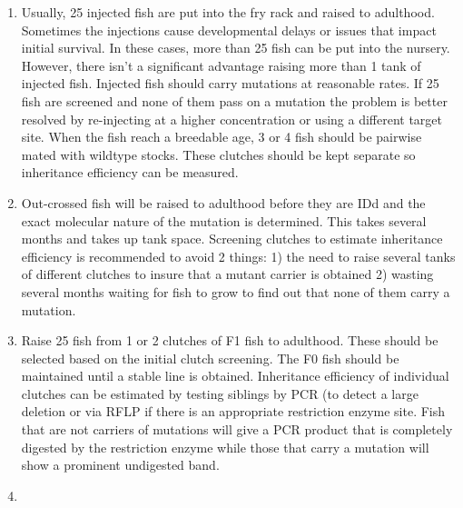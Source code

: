 \documentclass[
  letterpaper,
  DIV=11,
  numbers=noendperiod]{scrreprt}
\begin{document}
\begin{tcolorbox}[enhanced jigsaw, toprule=.15mm, breakable, coltitle=black, leftrule=.75mm, title=\textcolor{quarto-callout-note-color}{\faInfo}\hspace{0.5em}{Notes}, bottomrule=.15mm, toptitle=1mm, bottomtitle=1mm, colframe=quarto-callout-note-color-frame, opacityback=0, colback=white, opacitybacktitle=0.6, colbacktitle=quarto-callout-note-color!10!white, rightrule=.15mm, titlerule=0mm, arc=.35mm, left=2mm]

\begin{enumerate}
\def\labelenumi{\arabic{enumi}.}
\item
  Usually, 25 injected fish are put into the fry rack and raised to
  adulthood. Sometimes the injections cause developmental delays or
  issues that impact initial survival. In these cases, more than 25 fish
  can be put into the nursery. However, there isn't a significant
  advantage raising more than 1 tank of injected fish. Injected fish
  should carry mutations at reasonable rates. If 25 fish are screened
  and none of them pass on a mutation the problem is better resolved by
  re-injecting at a higher concentration or using a different target
  site. When the fish reach a breedable age, 3 or 4 fish should be
  pairwise mated with wildtype stocks. These clutches should be kept
  separate so inheritance efficiency can be measured.
\item
  Out-crossed fish will be raised to adulthood before they are IDd and
  the exact molecular nature of the mutation is determined. This takes
  several months and takes up tank space. Screening clutches to estimate
  inheritance efficiency is recommended to avoid 2 things: 1) the need
  to raise several tanks of different clutches to insure that a mutant
  carrier is obtained 2) wasting several months waiting for fish to grow
  to find out that none of them carry a mutation.
\item
  Raise 25 fish from 1 or 2 clutches of F1 fish to adulthood. These
  should be selected based on the initial clutch screening. The F0 fish
  should be maintained until a stable line is obtained. Inheritance
  efficiency of individual clutches can be estimated by testing siblings
  by PCR (to detect a large deletion or via RFLP if there is an
  appropriate restriction enzyme site. Fish that are not carriers of
  mutations will give a PCR product that is completely digested by the
  restriction enzyme while those that carry a mutation will show a
  prominent undigested band.
\item

\end{enumerate}
\end{tcolorbox}
\end{document}
